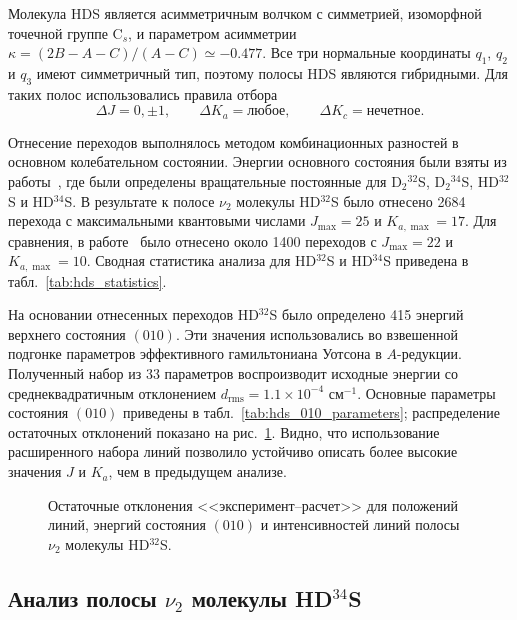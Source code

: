 Молекула HDS является асимметричным волчком с симметрией, изоморфной точечной группе C$_s$, и
параметром асимметрии $\kappa=(2B-A-C)/(A-C)\simeq -0.477$. Все три нормальные координаты $q_1$,
$q_2$ и $q_3$ имеют симметричный тип, поэтому полосы HDS являются гибридными. Для таких полос
использовались правила отбора
\begin{equation}
\Delta J=0,\pm1,\qquad \Delta K_a=\text{любое},\qquad \Delta K_c=\text{нечетное}.
\label{eq:hds_selection_rules}
\end{equation}

Отнесение переходов выполнялось методом комбинационных разностей в основном колебательном состоянии.
Энергии основного состояния были взяты из работы~\cite{d2s_camy1985}, где были определены
вращательные постоянные для D$_2{}^{32}$S, D$_2{}^{34}$S, HD$^{32}$S и HD$^{34}$S. В результате к полосе
$\nu_2$ молекулы HD$^{32}$S было отнесено 2684 перехода с максимальными квантовыми числами
$J_{\max}=25$ и $K_{a,\max}=17$. Для сравнения, в работе~\cite{hds_ulenikov1995} было отнесено около
1400 переходов с $J_{\max}=22$ и $K_{a,\max}=10$. Сводная статистика анализа для HD$^{32}$S и
HD$^{34}$S приведена в табл.~\ref{tab:hds_statistics}.



На основании отнесенных переходов HD$^{32}$S было определено 415 энергий верхнего состояния $(010)$.
Эти значения использовались во взвешенной подгонке параметров эффективного гамильтониана Уотсона в
$A$-редукции. Полученный набор из 33 параметров воспроизводит исходные энергии со
среднеквадратичным отклонением $d_{\textrm{rms}}=1.1\times10^{-4}$ см$^{-1}$. Основные параметры
состояния $(010)$ приведены в табл.~\ref{tab:hds_010_parameters}; распределение остаточных отклонений
показано на рис.~\ref{fig:hds32_residuals}. Видно, что использование расширенного набора линий позволило
устойчиво описать более высокие значения $J$ и $K_a$, чем в предыдущем анализе.



\begin{figure}[htbp]
    \centering
    \caption{Остаточные отклонения <<эксперимент--расчет>> для положений линий, энергий состояния
    $(010)$ и интенсивностей линий полосы $\nu_2$ молекулы HD$^{32}$S.}
    \label{fig:hds32_residuals}
\end{figure}

\subsection{Анализ полосы $\nu_2$ молекулы HD$^{34}$S}


